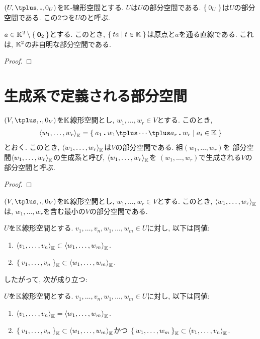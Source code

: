 \begin{example}
  $(U,\plus ,\act,0_U)$を$\mathbb{K}$-線形空間とする.
  $U$は$U$の部分空間である.
  $\Set{0_U}$は$U$の部分空間である.
  この2つを$U$のと呼ぶ.
\end{example}

\begin{example}
  $a\in \mathbb{K}^2\setminus\Set{\boldsymbol{0}_2}$とする.
  このとき, $\Set{ta|t\in \mathbb{K}}$は原点と$a$を通る直線である.
  これは, $\mathbb{K}^2$の非自明な部分空間である.
\end{example}
\begin{proof}\end{proof}


\section{生成系で定義される部分空間}

\begin{example}
  $(V,\plus,\act,0_V)$を$\mathbb{K}$線形空間とし,
  $w_1,\ldots,w_r\in V$とする.
  このとき,
  \begin{align*}
  \Braket{w_1,\ldots,w_r}_{\KK}=\Set{a_1\act w_1\plus\cdots \plus a_r\act w_r|a_i\in\KK}
  \end{align*}
  とおく.
  このとき,
  $\Braket{w_1,\ldots,w_r}_{\mathbb{K}}$は$V$の部分空間である.
組$(w_1,\ldots,w_r)$を
部分空間$\Braket{w_1,\ldots,w_r}_{\mathbb{K}}$の生成系と呼び,
$\Braket{w_1,\ldots,w_r}_{\mathbb{K}}$を
$(w_1,\ldots,w_r)$で生成される$V$の部分空間と呼ぶ.
\end{example}
\begin{proof}\end{proof}



\begin{prop}
  $(V,\plus,\act,0_V)$を$\mathbb{K}$線形空間とし,
  $w_1,\ldots,w_r\in V$とする.
  このとき,
  $\Braket{w_1,\ldots,w_r}_{\mathbb{K}}$
  は,
  $w_1,\ldots,w_r$を含む最小の$V$の部分空間である.
\end{prop}

\begin{lemma}
  \label{lem:gen:inclusion}
  $U$を$\mathbb{K}$線形空間とする.
  $v_1,\ldots,v_n,w_1,\ldots,w_m\in U$に対し,
  以下は同値:
  \begin{enumerate}
  \item $\Braket{v_1,\ldots,v_n}_{\mathbb{K}}\subset\Braket{w_1,\ldots,w_m}_{\mathbb{K}}$.
  \item $\Set{v_1,\ldots,v_n}_{\mathbb{K}}\subset\Braket{w_1,\ldots,w_m}_{\mathbb{K}}$.
  \end{enumerate}
\end{lemma}
したがって,
次が成り立つ:
\begin{lemma}
  \label{thm:gens:eq}
  $U$を$\mathbb{K}$線形空間とする.
  $v_1,\ldots,v_n,w_1,\ldots,w_m\in U$に対し,
  以下は同値:
  \begin{enumerate}
  \item $\Braket{v_1,\ldots,v_n}_{\mathbb{K}}=\Braket{w_1,\ldots,w_m}_{\mathbb{K}}$.
  \item $\Set{v_1,\ldots,v_n}_{\mathbb{K}}\subset\Braket{w_1,\ldots,w_m}_{\mathbb{K}}$かつ
    $\Set{w_1,\ldots,w_m}_{\mathbb{K}}\subset\Braket{v_1,\ldots,v_n}_{\mathbb{K}}$.
  \end{enumerate}
\end{lemma}

